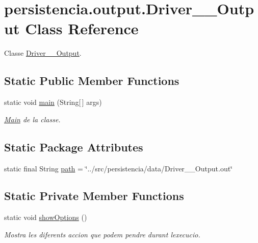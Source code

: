 \hypertarget{classpersistencia_1_1output_1_1Driver____Output}{}\section{persistencia.\+output.\+Driver\+\_\+\+\_\+\+Output Class Reference}
\label{classpersistencia_1_1output_1_1Driver____Output}


Classe \hyperlink{classpersistencia_1_1output_1_1Driver____Output}{Driver\+\_\+\+\_\+\+Output}.  


\subsection*{Static Public Member Functions}
\begin{DoxyCompactItemize}
\item 
static void \hyperlink{classpersistencia_1_1output_1_1Driver____Output_a1fcfdd813a7c5460772e74b5709fc030}{main} (String\mbox{[}$\,$\mbox{]} args)
\begin{DoxyCompactList}\small\item\em \hyperlink{classMain}{Main} de la classe. \end{DoxyCompactList}\end{DoxyCompactItemize}
\subsection*{Static Package Attributes}
\begin{DoxyCompactItemize}
\item 
static final String \hyperlink{classpersistencia_1_1output_1_1Driver____Output_a1701bae356c7bf388a5466895c22ff64}{path} = \char`\"{}../src/persistencia/data/Driver\+\_\+\+\_\+\+Output.\+out\char`\"{}
\end{DoxyCompactItemize}
\subsection*{Static Private Member Functions}
\begin{DoxyCompactItemize}
\item 
static void \hyperlink{classpersistencia_1_1output_1_1Driver____Output_a73ae13b88bf305d442012408333aae35}{show\+Options} ()
\begin{DoxyCompactList}\small\item\em Mostra les diferents accion que podem pendre durant l\textquotesingle{}execucio. \end{DoxyCompactList}\end{DoxyCompactItemize}


